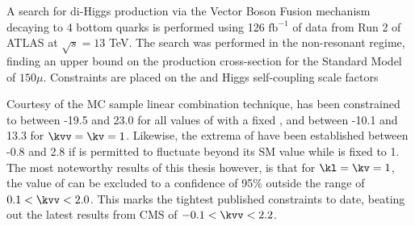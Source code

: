 A search for di-Higgs production via the Vector Boson Fusion mechanism
    decaying to 4 bottom quarks is performed using 
    126 $\textrm{fb}^{-1}$ of data from Run 2 of ATLAS at $\sqrt{s}=13$ TeV.
The search was performed in the non-resonant regime,
    finding an upper bound on the production cross-section
    for the Standard Model \vbfproc of $150\mu$.
Constraints are placed on the \kvv and \kl Higgs self-coupling scale factors


Courtesy of the MC sample linear combination technique,
    \kl has been constrained to between -19.5 and 23.0 for all values of \kvv with a fixed ,
    and between -10.1 and 13.3 for $\kvv=\kv=1$.
Likewise, the extrema of \kvv have been established between -0.8 and 2.8
    if \kl is permitted to fluctuate beyond its SM value while \kv is fixed to 1.
The most noteworthy results of this thesis however, is that for $\kl=\kv=1$,
    the value of \kvv can be excluded to a confidence of 95\% outside the range of $0.1 < \kvv < 2.0$.
This marks the tightest published constraints to date, beating out the latest results from CMS
    of $-0.1 < \kvv < 2.2$\cite{cms_results}.
